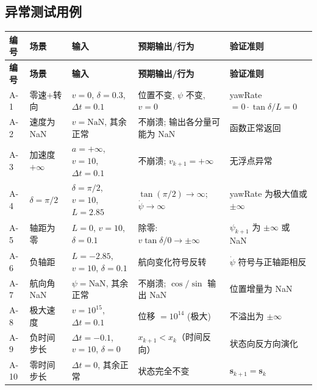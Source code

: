 \documentclass[a4paper,10pt]{article}
\begin{document}
\subsection{异常测试用例}

{\small
\begin{longtable}{|C{0.6cm}|L{1.8cm}|L{4.8cm}|L{3.8cm}|L{3.5cm}|}
\hline
\textbf{编号} & \textbf{场景} & \textbf{输入} & \textbf{预期输出/行为} & \textbf{验证准则} \\
\hline
\endfirsthead
\hline
\textbf{编号} & \textbf{场景} & \textbf{输入} & \textbf{预期输出/行为} & \textbf{验证准则} \\
\hline
\endhead
A-1 &
零速+转向 &
$v{=}0$, $\delta{=}0.3$, $\Delta t{=}0.1$ &
位置不变, $\psi$ 不变, $v{=}0$ &
yawRate $= 0 \cdot \tan\delta / L = 0$ \\
\hline
A-2 &
速度为 NaN &
$v{=}\text{NaN}$, 其余正常 &
不崩溃; 输出各分量可能为 NaN &
函数正常返回 \\
\hline
A-3 &
加速度 $+\infty$ &
$a{=}+\infty$, $v{=}10$, $\Delta t{=}0.1$ &
不崩溃; $v_{k+1}{=}+\infty$ &
无浮点异常 \\
\hline
A-4 &
$\delta{=}\pi/2$ &
$\delta{=}\pi/2$, $v{=}10$, $L{=}2.85$ &
$\tan(\pi/2) \to \infty$; $\dot\psi \to \infty$ &
yawRate 为极大值或 $\pm\infty$ \\
\hline
A-5 &
轴距为零 &
$L{=}0$, $v{=}10$, $\delta{=}0.1$ &
除零: $v\tan\delta/0 \to \pm\infty$ &
$\psi_{k+1}$ 为 $\pm\infty$ 或 NaN \\
\hline
A-6 &
负轴距 &
$L{=}{-}2.85$, $v{=}10$, $\delta{=}0.1$ &
航向变化符号反转 &
$\dot\psi$ 符号与正轴距相反 \\
\hline
A-7 &
航向角 NaN &
$\psi{=}\text{NaN}$, 其余正常 &
不崩溃; $\cos/\sin$ 输出 NaN &
位置增量为 NaN \\
\hline
A-8 &
极大速度 &
$v{=}10^{15}$, $\Delta t{=}0.1$ &
位移 $= 10^{14}$ (极大) &
不溢出为 $\pm\infty$ \\
\hline
A-9 &
负时间步长 &
$\Delta t{=}{-}0.1$, $v{=}10$, $\delta{=}0$ &
$x_{k+1} < x_k$（时间反向） &
状态向反方向演化 \\
\hline
A-10 &
零时间步长 &
$\Delta t{=}0$, 其余正常 &
状态完全不变 &
$\mathbf{s}_{k+1} = \mathbf{s}_k$ \\
\hline
\end{longtable}
}
\end{document}
